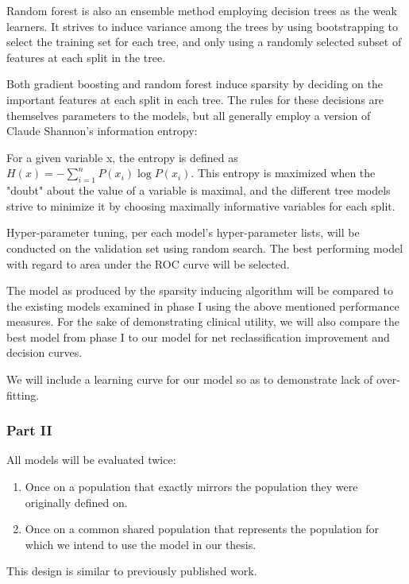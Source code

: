 \documentclass[a4paper,12pt]{article}
\begin{document}
		Random forest is also an ensemble method employing decision trees as the weak learners. It strives to induce variance among the trees by using bootstrapping to select the training set for each tree, and only using a randomly selected subset of features at each split in the tree.
		
		Both gradient boosting and random forest induce sparsity by deciding on the important features at each split in each tree. The rules for these decisions are themselves parameters to the models, but all generally employ a version of Claude Shannon's information entropy\cite{Shannon1948}:
		
		For a given variable x, the entropy is defined as $ H(x) = -\sum_{i=1}^{n} P(x_i) \log P(x_i)$. This entropy is maximized when the "doubt" about the value of a variable is maximal, and the different tree models strive to minimize it by choosing maximally informative variables for each split.
		
		Hyper-parameter tuning, per each model's hyper-parameter lists, will be conducted on the validation set using random search\cite{Bergstra2012}. The best performing model with regard to area under the ROC curve will be selected.
		
		The model as produced by the sparsity inducing algorithm will be compared to the existing models examined in phase I using the above mentioned performance measures. For the sake of demonstrating clinical utility, we will also compare the best model from phase I to our model for net reclassification improvement\cite{Pencina2008} and decision curves\cite{Vickers2016}.
		
		We will include a learning curve for our model so as to demonstrate lack of over-fitting.
		
		\subsubsection{Part II}
		
		All models will be evaluated twice:
		\begin{enumerate}
			\item Once on a population that exactly mirrors the population they were originally defined on.
			\item Once on a common shared population that represents the population for which we intend to use the model in our thesis.
		\end{enumerate}
		This design is similar to previously published work\cite{Dagan2017}.
		
\end{document}
